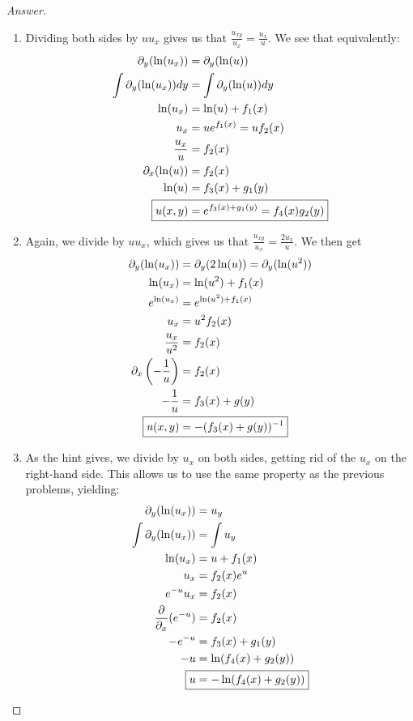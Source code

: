 \documentclass{article}
\theoremstyle{definition}
\renewcommand\qedsymbol{$\blacksquare$}
\newenvironment{ans}{\begin{proof}[Answer]\renewcommand{\qedsymbol}{}}{\end{proof}}
\begin{document}
	\begin{ans}
		\begin{enumerate}[resume*=answers]
			\item Dividing both sides by $uu_x$ gives us that $\frac{u_{xy}}{u_x} = \frac{u_x}{u}$. We see that equivalently:
			\begin{align*}
				\partial_y(\ln(u_x)) &= \partial_y(\ln(u))\\
				\int \partial_y(\ln(u_x))dy &= \int \partial_y(\ln(u))dy\\
				\ln(u_x) &= \ln(u) + f_1(x)\\
				u_x &= ue^{f_1(x)} = uf_2(x)\\
				\frac{u_x}{u} &= f_2(x)\\
				\partial_x(\ln(u)) &= f_2(x)\\
				\ln(u) &= f_3(x) + g_1(y)\\
				\Aboxed{u(x,y) &= e^{f_3(x)+ g_1(y)} = f_4(x)g_2(y)}
			\end{align*}
			
			\item Again, we divide by $uu_x$, which gives us that $\frac{u_{xy}}{u_x} = \frac{2u_x}{u}$. We then get
			\begin{align*}
				\partial_y(\ln(u_x)) &= \partial_y(2 \ln(u)) = \partial_y(\ln(u^2))\\
				\ln(u_x) &= \ln(u^2) + f_1(x)\\
				e^{\ln(u_x)} &= e^{\ln(u^2) + f_1(x)}\\
				u_x &= u^2f_2(x)\\
				\frac{u_x}{u^2} &= f_2(x)\\
				\partial_x\left(-\frac{1}{u}\right) &= f_2(x)\\
				-\frac{1}{u} &= f_3(x) + g(y)\\
				\Aboxed{u(x,y) &= -(f_3(x) + g(y))^{-1}}
			\end{align*}
			
			\item As the hint gives, we divide by $u_x$ on both sides, getting rid of the $u_x$ on the right-hand side. This allows us to use the same property as the previous problems, yielding:
			\begin{align*}
				\partial_y(\ln(u_x)) &= u_y\\
				\int \partial_y(\ln(u_x)) &= \int u_y\\
				\ln(u_x) &= u + f_1(x)\\
				u_x &= f_2(x)e^u\\
				e^{-u}u_x &= f_2(x)\\
				\frac{\partial}{\partial_x} (e^{-u}) &= f_2(x)\\
				-e^{-u} &= f_3(x) + g_1(y)\\
				-u &= \ln(f_4(x) + g_2(y))\\
				\Aboxed{u &= -\ln(f_4(x) + g_2(y))}
			\end{align*}
			
		\end{enumerate}
	\end{ans}
	
\end{document}
